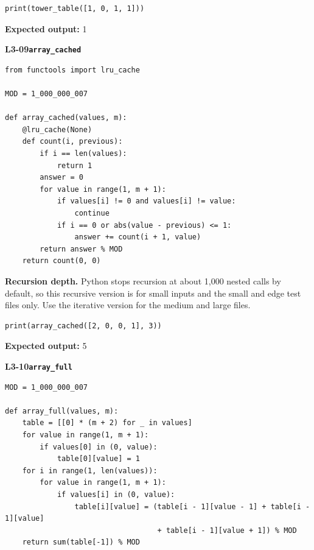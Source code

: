 \documentclass[11pt,a4paper]{article}
\begin{document}
\begin{lstlisting}
print(tower_table([1, 0, 1, 1]))
\end{lstlisting}
\textbf{Expected output:} 1
\par\bigskip
{}
{\color{teal}\textbf{L3-09}}\quad\textbf{\texttt{array\_cached}}\label{L3-code-array_cached}\par
\begin{lstlisting}[style=numbered]
from functools import lru_cache

MOD = 1_000_000_007

def array_cached(values, m):
    @lru_cache(None)
    def count(i, previous):
        if i == len(values):
            return 1
        answer = 0
        for value in range(1, m + 1):
            if values[i] != 0 and values[i] != value:
                continue
            if i == 0 or abs(value - previous) <= 1:
                answer += count(i + 1, value)
        return answer % MOD
    return count(0, 0)
\end{lstlisting}
\textbf{Recursion depth.} Python stops recursion at about 1,000 nested calls by default, so this recursive version is for small inputs and the small and edge test files only. Use the iterative version for the medium and large files.


\begin{lstlisting}
print(array_cached([2, 0, 0, 1], 3))
\end{lstlisting}
\textbf{Expected output:} 5
\par\bigskip
{}
{\color{teal}\textbf{L3-10}}\quad\textbf{\texttt{array\_full}}\label{L3-code-array_full}\par
\begin{lstlisting}[style=numbered]
MOD = 1_000_000_007

def array_full(values, m):
    table = [[0] * (m + 2) for _ in values]
    for value in range(1, m + 1):
        if values[0] in (0, value):
            table[0][value] = 1
    for i in range(1, len(values)):
        for value in range(1, m + 1):
            if values[i] in (0, value):
                table[i][value] = (table[i - 1][value - 1] + table[i - 1][value]
                                   + table[i - 1][value + 1]) % MOD
    return sum(table[-1]) % MOD
\end{lstlisting}
\end{document}
